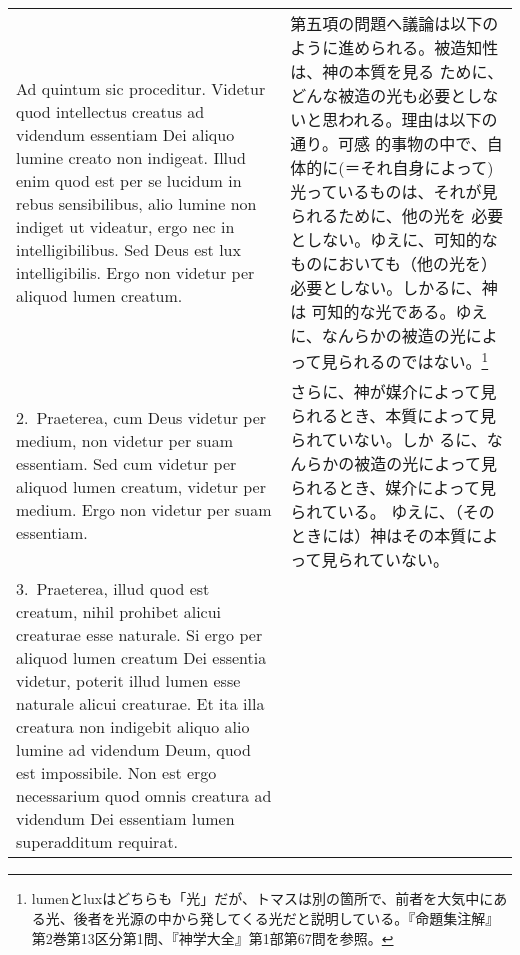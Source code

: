 \documentclass[10pt]{jsarticle} %
\begin{document}
\begin{longtable}{p{21em}p{21em}}
{\huge A}{\sc  d quintum sic proceditur}. Videtur quod intellectus creatus ad
 videndum essentiam Dei aliquo lumine creato non indigeat. Illud enim
 quod est per se lucidum in rebus sensibilibus, alio lumine non indiget
 ut videatur, ergo nec in intelligibilibus. Sed Deus est lux
 intelligibilis. Ergo non videtur per aliquod lumen creatum.

&

第五項の問題へ議論は以下のように進められる。被造知性は、神の本質を見る
ために、どんな被造の光も必要としないと思われる。理由は以下の通り。可感
的事物の中で、自体的に(＝それ自身によって)光っているものは、それが見られるために、他の光を
必要としない。ゆえに、可知的なものにおいても（他の光を）必要としない。しかるに、神は
可知的な光である。ゆえに、なんらかの被造の光によって見られるのではない。\footnote{lumenとluxはどちらも「光」だが、トマスは別の箇所で、前者を大気中にある光、後者を光源の中から発してくる光だと説明している。『命題集注解』第2巻第13区分第1問、『神学大全』第1部第67問を参照。}

\\


2.~{\sc Praeterea}, cum Deus videtur per medium, non videtur per suam
essentiam. Sed cum videtur per aliquod lumen creatum, videtur per
medium. Ergo non videtur per suam essentiam.

&

さらに、神が媒介によって見られるとき、本質によって見られていない。しか
るに、なんらかの被造の光によって見られるとき、媒介によって見られている。
ゆえに、（そのときには）神はその本質によって見られていない。



\\


3.~{\sc Praeterea}, illud quod est creatum, nihil prohibet alicui
creaturae esse naturale. Si ergo per aliquod lumen creatum Dei
essentia videtur, poterit illud lumen esse naturale alicui
creaturae. Et ita illa creatura non indigebit aliquo alio lumine ad
videndum Deum, quod est impossibile. Non est ergo necessarium quod
omnis creatura ad videndum Dei essentiam lumen superadditum requirat.


&


\end{longtable}
\end{document}
